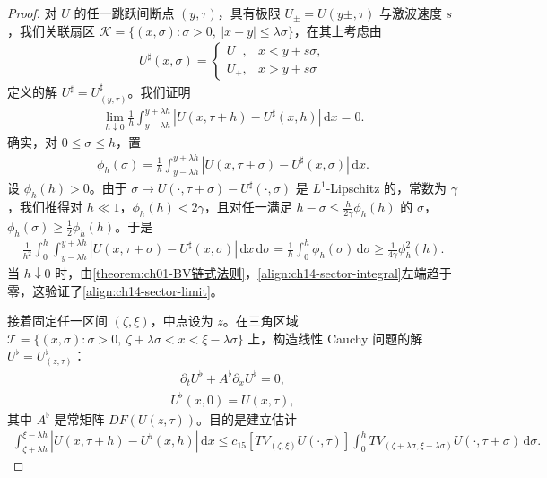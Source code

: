 \documentclass[../../main.tex]{subfiles}
\begin{document}
\begin{proof}
对 $U$ 的任一跳跃间断点 $(y,\tau)$，具有极限 $U_\pm=U(y\pm,\tau)$ 与激波速度 $s$，我们关联扇区 $\mathscr{K}=\{(x,\sigma):\sigma>0,\ |x-y|\leqslant\lambda\sigma\}$，在其上考虑由
\begin{align}
U^\sharp(x,\sigma)=
\begin{cases}
U_-, & x<y+s\sigma,\\
U_+, & x>y+s\sigma
\end{cases}
\label{align:ch14-sector}
\end{align}
定义的解 $U^\sharp=U^\sharp_{(y,\tau)}$。我们证明
\begin{align}
\lim_{h\downarrow0}\frac1h\int_{y-\lambda h}^{y+\lambda h}|U(x,\tau+h)-U^\sharp(x,h)|\,\mathrm{d}x=0.
\label{align:ch14-sector-limit}
\end{align}
确实，对 $0\leqslant\sigma\leqslant h$，置
\begin{align}
\phi_h(\sigma)=\frac1h\int_{y-\lambda h}^{y+\lambda h}|U(x,\tau+\sigma)-U^\sharp(x,\sigma)|\,\mathrm{d}x.
\label{align:ch14-phi}
\end{align}
设 $\phi_h(h)>0$。由于 $\sigma\mapsto U(\cdot,\tau+\sigma)-U^\sharp(\cdot,\sigma)$ 是 $L^1$-Lipschitz 的，常数为 $\gamma$，我们推得对 $h\ll1$，$\phi_h(h)<2\gamma$，且对任一满足 $h-\sigma\leqslant\frac{h}{2\gamma}\phi_h(h)$ 的 $\sigma$，$\phi_h(\sigma)\geqslant\frac12\phi_h(h)$。于是
\begin{align}
\frac{1}{h^2}\int_0^h\int_{y-\lambda h}^{y+\lambda h}|U(x,\tau+\sigma)-U^\sharp(x,\sigma)|\,\mathrm{d}x\,\mathrm{d}\sigma=\frac1h\int_0^h\phi_h(\sigma)\,\mathrm{d}\sigma\geqslant\frac{1}{4\gamma}\phi_h^2(h).
\label{align:ch14-sector-integral}
\end{align}
当 $h\downarrow0$ 时，由\cref{theorem:ch01-BV链式法则}，\eqref{align:ch14-sector-integral}左端趋于零，这验证了\eqref{align:ch14-sector-limit}。



接着固定任一区间 $(\zeta,\xi)$，中点设为 $z$。在三角区域 $\mathscr{T}=\{(x,\sigma):\sigma>0,\ \zeta+\lambda\sigma<x<\xi-\lambda\sigma\}$ 上，构造线性 Cauchy 问题的解 $U^\flat=U^\flat_{(z,\tau)}$：
\begin{align}
\partial_t U^\flat+A^\flat\partial_x U^\flat=0,
\label{align:ch14-linear-pde}
\end{align}
\begin{align}
U^\flat(x,0)=U(x,\tau),
\label{align:ch14-linear-ic}
\end{align}
其中 $A^\flat$ 是常矩阵 $DF(U(z,\tau))$。目的是建立估计
\begin{align}
\int_{\zeta+\lambda h}^{\xi-\lambda h}|U(x,\tau+h)-U^\flat(x,h)|\,\mathrm{d}x\leqslant c_{15}[TV_{(\zeta,\xi)}U(\cdot,\tau)]\int_0^h TV_{(\zeta+\lambda\sigma,\xi-\lambda\sigma)}U(\cdot,\tau+\sigma)\,\mathrm{d}\sigma.
\label{align:ch14-linear-est}
\end{align}


\end{proof}
\end{document}
